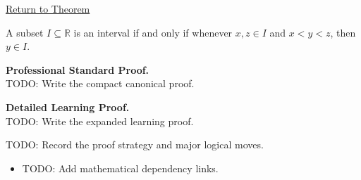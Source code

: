 \newpage
{}
\label{prf:convexity-characterization-of-intervals-in-r}

\begin{remark*}[Return]
\hyperref[thm:convexity-characterization-of-intervals-in-r]{Return to Theorem}
\end{remark*}

\begin{theorem*}
A subset $I \subseteq \mathbb{R}$ is an interval if and only if
whenever $x,z \in I$ and $x < y < z$, then $y \in I$.
\end{theorem*}

\textbf{Professional Standard Proof.}~\\
TODO: Write the compact canonical proof.

\textbf{Detailed Learning Proof.}~\\
TODO: Write the expanded learning proof.

\begin{remark*}
TODO: Record the proof strategy and major logical moves.
\end{remark*}

\begin{dependencies}
\begin{itemize}
  \item TODO: Add mathematical dependency links.
\end{itemize}
\end{dependencies}
